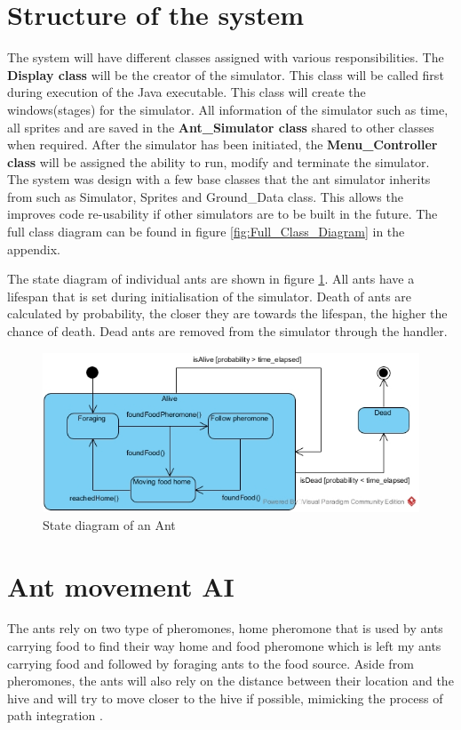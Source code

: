 \documentclass[a4paper, oneside, 11pt]{report}
\begin{document}
\section{Structure of the system}
The system will have different classes assigned with various responsibilities. The \textbf{Display class} will be the creator of the simulator. This class will be called first during execution of the Java executable. This class will create the windows(stages) for the simulator. All information of the simulator such as time, all sprites and are saved in the \textbf{Ant\_Simulator class} shared to other classes when required. After the simulator has been initiated, the \textbf{Menu\_Controller class} will be assigned the ability to run, modify and terminate the simulator. The system was design with a few base classes that the ant simulator inherits from such as Simulator, Sprites and Ground\_Data class. This allows the improves code re-usability if other simulators are to be built in the future. The full class diagram can be found in figure \ref{fig:Full_Class_Diagram} in the appendix.

  The state diagram of individual ants are shown in figure \ref{fig:State_Diagram}. All ants have a lifespan that is set during initialisation of the simulator. Death of ants are calculated by probability, the closer they are towards the lifespan, the higher the chance of death. Dead ants are removed from the simulator through the handler.

\begin{figure}[htb]
	\begin{center}
	\includegraphics[width=0.8 \columnwidth]{State_Diagram.jpg}
	\caption{State diagram of an Ant}
	\label{fig:State_Diagram}
	\end{center}
\end{figure}


\section{Ant movement AI}
The ants rely on two type of pheromones, home pheromone that is used by ants carrying food to find their way home and food pheromone which is left my ants carrying food and followed by foraging ants to the food source. Aside from pheromones, the ants will also rely on the distance between their location and the hive and will try to move closer to the hive if possible, mimicking the process of path integration \citep{Ant_Path_Integration}.
\end{document}
